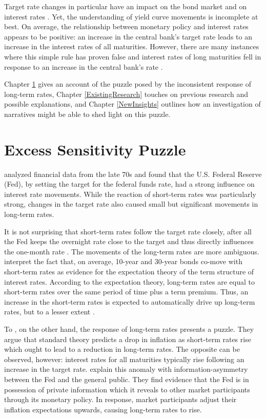 \documentclass[11pt,a4paper,english,oneside]{book}
\numberwithin{equation}{chapter}
\begin{document}
Target rate changes in particular have an impact on the bond market and on interest rates \citep[p. 332]{Cook.1989}. %
Yet, the understanding of yield curve movements is incomplete at best. On average, the relationship between monetary policy and interest rates appears to be positive: an increase in the central bank's target rate leads to an increase in the interest rates of all maturities. However, there are many instances where this simple rule has proven false and interest rates of long maturities fell in response to an increase in the central bank's rate \citep[p. 1594]{Ellingsen.2001}. 

Chapter \ref{SensitivityPuzzle} gives an account of the puzzle posed by the inconsistent response of long-term rates, Chapter \ref{ExistingResearch} touches on previous research and possible explanations, and Chapter  \ref{NewInsights} outlines how an investigation of narratives might be able to shed light on this puzzle.


\section{Excess Sensitivity Puzzle} \label{SensitivityPuzzle}

\cite{Cook.1989} analyzed financial data from the late 70s and found that the U.S. Federal Reserve (Fed), by setting the target for the federal funds rate, had a strong influence on interest rate movements. While the reaction of short-term rates was particularly strong, changes in the target rate also caused small but significant movements in long-term rates. 
 
It is not surprising that short-term rates follow the target rate closely, after all the Fed keeps the overnight rate close to the target and thus directly influences the one-month rate \citep[p. 1]{Ellingsen.2003}. The movements of the long-term rates are more ambiguous. \citet[pp. 343--346]{Cook.1989} interpret the fact that, on average, 10-year and 30-year bonds co-move with short-term rates as evidence for the expectation theory of the term structure of interest rates. According to the expectation theory, long-term rates are equal to short-term rates over the same period of time plus a term premium. Thus, an increase in the short-term rates is expected to automatically drive up long-term rates, but to a lesser extent \citep[p. 1594]{Ellingsen.2001}.

To \cite{Romer.2000}, on the other hand, the response of long-term rates presents a puzzle. They argue that standard theory predicts a drop in inflation as short-term rates rise which ought to lead to a reduction in long-term rates. The opposite can be observed, however: interest rates for all maturities typically rise following an increase in the target rate. \cite{Romer.2000} explain this anomaly with information-asymmetry between the Fed and the general public. They find evidence that the Fed is in possession of private information which it reveals to other market participants through its monetary policy. In response, market participants adjust their inflation expectations upwards, causing long-term rates to rise.
\end{document}
